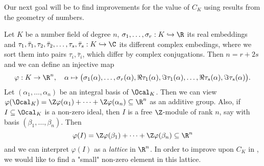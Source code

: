 Our next goal will be to find improvements for the value of \( C_K \) using results from the geometry of numbers.

\begin{idee*}
	Let \( K \) be a number field of degree \( n \), \( \sigma_1, \dotsc, \sigma_r: K \hookrightarrow \R \) its real embeddings and \( \tau_1, \bar{\tau}_1, \tau_2, \bar{\tau}_2, \dotsc, \tau_s, \bar{\tau}_s: K \hookrightarrow \C \) its different complex embedings, where we sort them into pairs \( \tau_i, \bar{\tau}_i \), which differ by complex conjugations.
	Then \( n = r + 2s \) and we can define an injective map 
	\[ \varphi: K \to \R^n,\quad \alpha \mapsto \big( \sigma_1(\alpha), \dotsc, \sigma_r(\alpha), \Re \tau_1(\alpha), \Im \tau_1(\alpha), \dotsc, \Re \tau_s(\alpha), \Im \tau_s(\alpha) \big). \]
	Let \( (\alpha_1, \dotsc, \alpha_n) \) be an integral basis of \( \Ocal_K \).
	Then we can view \( \varphi(\Ocal_K) = \Z \varphi(\alpha_1) + \dots + \Z \varphi(\alpha_n) \subseteq \R^n \) as an additive group.
	Also, if \( I \subseteq \Ocal_K \) is a non-zero ideal, then \( I \) is a free \( \Z \)-module of rank \( n \), say with basis \( (\beta_1, \dotsc, \beta_n) \).
	Then
	\[ \varphi(I) = \Z \varphi(\beta_1) + \dots + \Z \varphi(\beta_n) \subseteq \R^n \]
	and we can interpret \( \varphi(I) \) as a \emph{lattice} in \( \R^n \).
	In order to improve upon \( C_K \) in  , we would like to find a "small" non-zero element in this lattice.
\end{idee*}